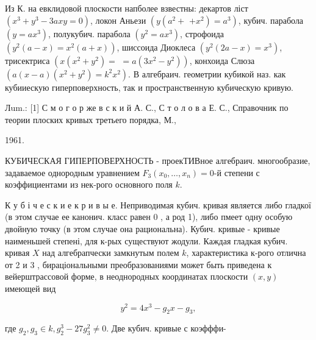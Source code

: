 \documentclass[10pt]{article}
\begin{document}
Из К. на евклидовой плоскости напболее взвестны: декартов ліст $\left(x^{3}+y^{3}-3 a x y=0\right)$, локон Аньези $\left(y\left(a^{2}+\right.\right.$ $\left.\left.+x^{2}\right)=a^{3}\right)$, кубич. парабола $\left(y=a x^{3}\right)$, полукубич. парабола $\left(y^{2}=a x^{3}\right)$, строфоида $\left(y^{2}(a-x)=x^{2}(a+x)\right)$, шиссоида Диоклеса $\left(y^{2}(2 a-x)=x^{3}\right)$, трисектриса $\left(x\left(x^{2}+y^{2}\right)=\right.$ $\left.=a\left(3 x^{2}-y^{2}\right)\right)$, конхоида Слюза $\left(a(x-a)\left(x^{2}+y^{2}\right)=k^{2} x^{2}\right)$. В алгебраич. геометрии кубикой наз. как кубииескую гиперповерхность, так и пространственную кубическую кривую.



Лum.: [1] С м о г о р же в с к и й А. С., С т о л о в а Е. С., Справочник по теории плоских кривых третьего порядка, М.,

1961.



КУБИЧЕСКАЯ ГИПЕРПОВЕРХНОСТЬ - проекТИВное алгебраич. многообразие, задаваемое однородным уравнением $F_{3}\left(x_{0}, \ldots, x_{n}\right)=0$-й степени с коэффициентами из нек-рого основного поля $k$.



К у б і ч е с к и е к р и в ы е. Неприводимая кубич. кривая является либо гладкої (в этом случае ее канонич. класс равен 0 , а род 1), либо пмеет одну особую двойную точку (в этом случае она рациональна). Кубич. кривые - кривые наименьшей степені, для к-рых существуют жодули. Каждая гладкая кубич. кривая $X$ над алгебрапчески замкнутым полем $k$, характеристика к-рого отлична от 2 и 3 , бираціональными преобразованиями может быть приведена к вейерштрассовой форме, в неоднородных координатах плоскости $(x, y)$ имеющей вид



\[

y^{2}=4 x^{3}-g_{2} x-g_{3},

\]



где $g_{2}, g_{3} \in k, g_{2}^{3}-27 g_{3}^{2} \neq 0$. Две кубич. кривые с коэфффи-
\end{document}
